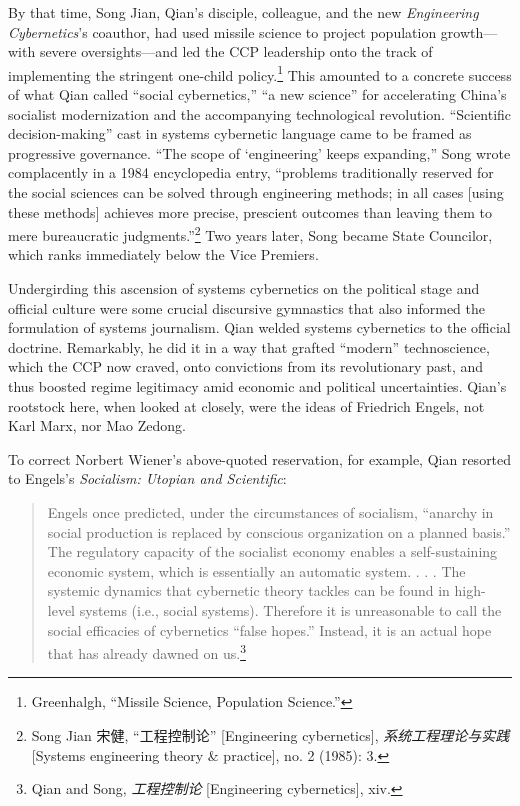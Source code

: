 \documentclass{tufte-handout}
\begin{document}
\begin{CJK*}{UTF8}{gbsn}
By that time, Song Jian, Qian's disciple, colleague, and the new
\emph{Engineering Cybernetics}'s coauthor, had used missile science to
project population growth---with severe oversights---and led the CCP
leadership onto the track of implementing the stringent one-child
policy.\footnote{Greenhalgh, ``Missile Science, Population Science.''}
This amounted to a concrete success of what Qian called ``social
cybernetics,'' ``a new science'' for accelerating China's socialist
modernization and the accompanying technological revolution.
``Scientific decision-making'' cast in systems cybernetic language came
to be framed as progressive governance. ``The scope of `engineering'
keeps expanding,'' Song wrote complacently in a 1984 encyclopedia entry,
``problems traditionally reserved for the social sciences can be solved
through engineering methods; in all cases {[}using these methods{]}
achieves more precise, prescient outcomes than leaving them to mere
bureaucratic judgments.''\footnote{Song Jian 宋健, ``工程控制论''
  {[}Engineering cybernetics{]}, \emph{系统工程理论与实践} {[}Systems
  engineering theory \& practice{]}, no. 2 (1985): 3.} Two years later,
Song became State Councilor, which ranks immediately below the Vice
Premiers.

Undergirding this ascension of systems cybernetics on the political
stage and official culture were some crucial discursive gymnastics that
also informed the formulation of systems journalism. Qian welded systems
cybernetics to the official doctrine. Remarkably, he did it in a way
that grafted ``modern'' technoscience, which the CCP now craved, onto
convictions from its revolutionary past, and thus boosted regime
legitimacy amid economic and political uncertainties. Qian's rootstock
here, when looked at closely, were the ideas of Friedrich Engels, not
Karl Marx, nor Mao Zedong.

To correct Norbert Wiener's above-quoted reservation, for example, Qian
resorted to Engels's \emph{Socialism: Utopian and Scientific}:

\begin{quote}
Engels once predicted, under the circumstances of socialism, ``anarchy
in social production is replaced by conscious organization on a planned
basis.'' The regulatory capacity of the socialist economy enables a
self-sustaining economic system, which is essentially an automatic
system. . . . The systemic dynamics that cybernetic theory tackles can
be found in high-level systems (i.e., social systems). Therefore it is
unreasonable to call the social efficacies of cybernetics ``false
hopes.'' Instead, it is an actual hope that has already dawned on
us.\footnote{Qian and Song, \emph{工程控制论} {[}Engineering
  cybernetics{]}, xiv.}
\end{quote}


\end{CJK*}
\end{document}
